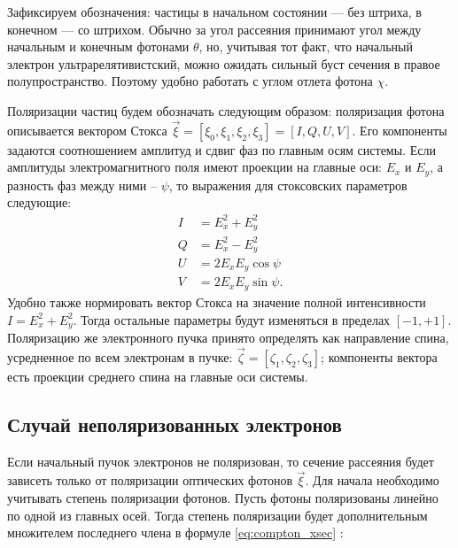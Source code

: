 \documentclass[12pt]{article}
\begin{document}
Зафиксируем обозначения: частицы в начальном состоянии --- без штриха, в конечном --- со штрихом. Обычно за угол рассеяния принимают угол между начальным и конечным фотонами $\theta$, но, учитывая тот факт, что начальный электрон ультрарелятивистский, можно ожидать сильный буст сечения в правое полупространство. Поэтому удобно работать с углом отлета фотона $\chi$. 
\par Поляризации частиц будем обозначать следующим образом: поляризация фотона описывается вектором Стокса $\vec{\xi} = [\xi_0,\xi_1,\xi_2,\xi_3]=[I,Q,U,V]$. Его компоненты задаются соотношением амплитуд и сдвиг фаз по главным осям системы. Если амплитуды электромагнитного поля имеют проекции на главные оси: $E_x$ и $E_y$, а разность фаз между ними -- $\psi$, то выражения для стоксовских параметров следующие: 
\begin{equation}
	\begin{split}
	I &= E_x^2 + E_y^2\\
	Q &= E_x^2 - E_y^2\\
	U &= 2E_x E_y \cos \psi\\
	V &= 2E_x E_y \sin \psi.
	\end{split}
	\label{eq:stokes_pars}
\end{equation}
Удобно также нормировать вектор Стокса на значение полной интенсивности $I = E_x^2 + E_y^2$. Тогда остальные параметры будут изменяться в пределах $[-1,+1]$. 
Поляризацию же электронного пучка принято определять как направление спина, усредненное по всем электронам в пучке: $\vec{\zeta} = [\zeta_1,\zeta_2,\zeta_3]$; компоненты вектора есть проекции среднего спина на главные оси системы.  


\subsection{Случай неполяризованных электронов}
Если начальный пучок электронов не поляризован, то сечение рассеяния будет зависеть только от поляризации оптических фотонов $\vec{\xi}$. Для начала необходимо учитывать степень поляризации фотонов. Пусть фотоны поляризованы линейно по одной из главных осей. Тогда степень поляризации будет дополнительным множителем последнего члена в формуле \ref{eq:compton_xsec} :
\end{document}
